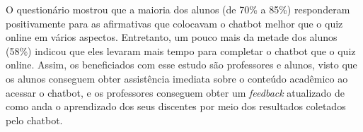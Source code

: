 \begin{figure}[ht] 
   	\captionsetup{width=16cm}
\end{figure}

O questionário mostrou que a maioria dos alunos (de 70\% a 85\%) responderam positivamente para as afirmativas que colocavam o chatbot melhor que o quiz online em vários aspectos. Entretanto, um pouco mais da metade dos alunos (58\%) indicou que eles levaram mais tempo para completar o chatbot que o quiz online. Assim, os beneficiados com esse estudo são professores e alunos, visto que os alunos conseguem obter assistência imediata sobre o conteúdo acadêmico ao acessar o chatbot, e os professores conseguem obter um \textit{feedback} atualizado de como anda o aprendizado dos seus discentes por meio dos resultados coletados pelo chatbot.